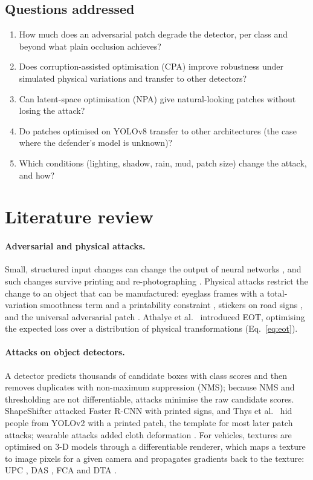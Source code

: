 \documentclass[11pt,a4paper]{article}
\begin{document}
\subsection{Questions addressed}
\begin{enumerate}
  \item How much does an adversarial patch degrade the detector, per class and beyond what plain occlusion achieves?
  \item Does corruption-assisted optimisation (CPA) improve robustness under simulated physical variations and transfer to other detectors?
  \item Can latent-space optimisation (NPA) give natural-looking patches without losing the attack?
  \item Do patches optimised on YOLOv8 transfer to other architectures (the case where the defender's model is unknown)?
  \item Which conditions (lighting, shadow, rain, mud, patch size) change the attack, and how?
\end{enumerate}

\section{Literature review}\label{sec:lit}

\paragraph{Adversarial and physical attacks.} Small, structured input changes can change the output of neural networks \cite{szegedy2014,goodfellow2015}, and such changes survive printing and re-photographing \cite{kurakin2017}. Physical attacks restrict the change to an object that can be manufactured: eyeglass frames with a total-variation smoothness term and a printability constraint \cite{sharif2016}, stickers on road signs \cite{eykholt2018}, and the universal adversarial patch \cite{brown2017}. Athalye et al.\ \cite{athalye2018} introduced EOT, optimising the expected loss over a distribution of physical transformations (Eq.~\ref{eq:eot}).

\paragraph{Attacks on object detectors.} A detector predicts thousands of candidate boxes with class scores and then removes duplicates with non-maximum suppression (NMS); because NMS and thresholding are not differentiable, attacks minimise the raw candidate scores. ShapeShifter \cite{chen2018shapeshifter} attacked Faster R-CNN with printed signs, and Thys et al.\ \cite{thys2019} hid people from YOLOv2 with a printed patch, the template for most later patch attacks; wearable attacks added cloth deformation \cite{xu2020tshirt,wu2020cloak}. For vehicles, textures are optimised on 3-D models through a differentiable renderer, which maps a texture to image pixels for a given camera and propagates gradients back to the texture: UPC \cite{huang2020upc}, DAS \cite{wang2021das}, FCA \cite{wang2022fca} and DTA \cite{suryanto2022dta}.
\end{document}
